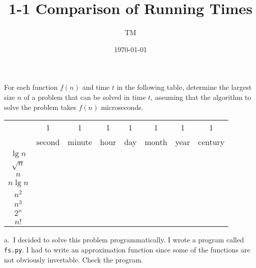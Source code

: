 \documentclass{article}
\title{1-1 Comparison of Running Times}
\author{TM}
\date{\today}
\begin{document}
For each function $f(n)$ and time $t$ in the following table,
determine the largest size $n$ of a problem that can be solved in time
$t$, assuming that the algorithm to solve the problem takes $f(n)$
microseconds.
\begin{tabular}{c|c|c|c|c|c|c|c|}
\multicolumn{1}{c|}{} & 1      & 1      & 1    & 1   & 1    & 1   & 1\\
\multicolumn{1}{c|}{} & second & minute & hour & day & month & year
	& century \\
\hline $\lg n$ &  &  &  &  &  &  &  \\
\hline $\sqrt{n}$ &  &  &  &  &  &  &  \\
\hline $n$ &  &  &  &  &  &  &  \\
\hline $n \lg n$ &  &  &  &  &  &  &  \\
\hline $n^2$ &  &  &  &  &  &  &  \\
\hline $n^3$ &  &  &  &  &  &  &  \\
\hline $2^n$ &  &  &  &  &  &  &  \\
\hline $n!$ &  &  &  &  &  &   &  \\
\hline
\end{tabular}
a.~I decided to solve this problem programmatically.  I wrote a program called {\tt fs.py}.  I had to write an approximation function since some of the functions are not obviously invertable.  Check the program.
\end{document}
